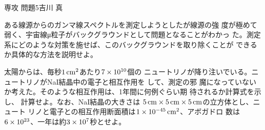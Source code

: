 \documentclass[fleqn]{jbook}
\begin{document}
\begin{question}{専攻 問題5}{吉川 真}
\begin{subquestions}
 \SubQuestion ある線源からのガンマ線スペクトルを測定しようとしたが線源の強
 度が極めて弱く、宇宙線μ粒子がバックグラウンドとして問題となることがわかっ
 た。測定系にどのような対策を施せば、このバックグラウンドを取り除くことが
 できるか具体的な方法を説明せよ。

 \SubQuestion 太陽からは、毎秒$1\,{\rm cm^2}$あたり$7\times 10^{10}$個の
 ニュートリノが降り注いでいる。ニュートリノがNaI結晶中の電子と相互作用を
 して、測定の邪
 魔になっていないか考えた。そのような相互作用は、1年間に何例ぐらい期
 待されるか計算式を示し、
 計算せよ。なお、NaI結晶の大きさは
 $5\,{\rm cm}\times 5\,{\rm cm}\times 5\,{\rm cm}$の立方体とし、ニュート
 リノと電子との相互作用断面積は$1\times 10^{-45}\,{\rm cm^2}$、アボガドロ
 数は$6\times 10^{23}$、一年は約$3\times 10^{7}$秒とせよ。

\end{subquestions}
 
\end{question}
\end{document}
